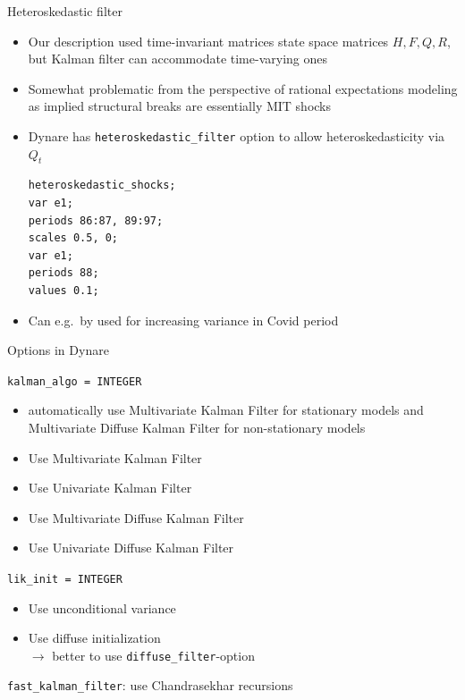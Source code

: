 \documentclass[handout,usepdftitle=false,xcolor=dvipsnames,aspectratio=169]{beamer}
\begin{document}
\begin{frame}[fragile]{Heteroskedastic filter}
  \begin{itemize}
    \item Our description used time-invariant matrices state space matrices $H,F,Q,R$, but Kalman filter can accommodate time-varying ones
    \item Somewhat problematic from the perspective of rational expectations modeling as implied structural breaks are essentially MIT shocks
    \item Dynare has \texttt{heteroskedastic\_filter} option to allow heteroskedasticity via $Q_t$
          \small
          \begin{verbatim}
heteroskedastic_shocks;
var e1;
periods 86:87, 89:97;
scales 0.5, 0;
var e1;
periods 88;
values 0.1;
  \end{verbatim}
    \item Can e.g.\ by used for increasing variance in Covid period
  \end{itemize}
\end{frame}


\begin{frame}{Options in Dynare}
  \begin{witemize}
    \item \texttt{kalman\_algo = INTEGER}
    \begin{itemize}
      \item[0] automatically use Multivariate Kalman Filter for stationary models and Multivariate Diffuse Kalman Filter for non-stationary models
      \item[1] Use Multivariate Kalman Filter
      \item[2] Use Univariate Kalman Filter
      \item[3] Use Multivariate Diffuse Kalman Filter
      \item[4] Use Univariate Diffuse Kalman Filter
    \end{itemize}
    \item \texttt{lik\_init = INTEGER}
    \begin{itemize}
      \item[1] Use unconditional variance
      \item[3] Use diffuse initialization\\
            $\rightarrow$ better to use \texttt{diffuse\_filter}-option
    \end{itemize}
    \item \texttt{fast\_kalman\_filter}: use Chandrasekhar recursions

  \end{witemize}
\end{frame}
\end{document}
